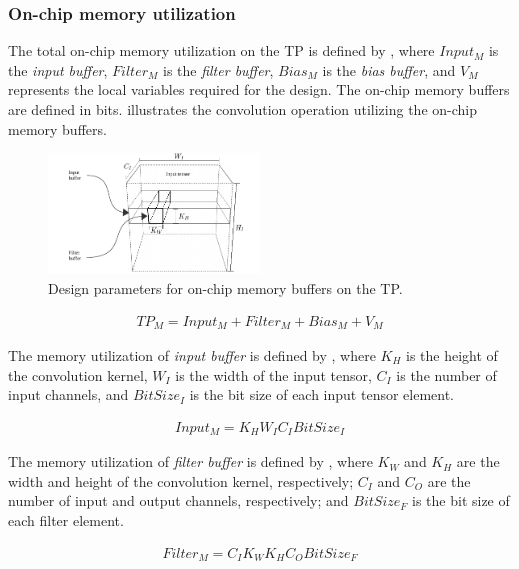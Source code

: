 \subsubsection{\textbf{On-chip memory utilization}}
The total on-chip memory utilization on the TP is defined by , where $Input_{M}$ is the \emph{input buffer}, $Filter_{M}$ is the \emph{filter buffer}, $Bias_{M}$ is the \emph{bias buffer}, and $V_{M}$ represents the local variables required for the design. The on-chip memory buffers are defined in bits.  illustrates the convolution operation utilizing the on-chip memory buffers.

\begin{figure}[t!]
	\centering
	\includegraphics[width=0.5\textwidth]{../figures/accelerator_buffers.pdf}
	\caption{Design parameters for on-chip memory buffers on the TP.}
	\label{fig:accelerator_buffers}
\end{figure}

\begin{eqnarray} \label{eq:tp_memory}
TP_{M}=Input_{M}+Filter_{M}+Bias_{M}+V_{M}
\end{eqnarray}

The memory utilization of \emph{input buffer} is defined by , where $K_{H}$ is the height of the convolution kernel, $W_{I}$ is the width of the input tensor, $C_{I}$ is the number of input channels, and $BitSize_{I}$ is the bit size of each input tensor element.

\begin{eqnarray} \label{eq:input_memory}
Input_{M}=K_{H}W_{I}C_{I}BitSize_{I}
\end{eqnarray}

The memory utilization of \emph{filter buffer} is defined by , where $K_{W}$ and $K_{H}$ are the width and height of the convolution kernel, respectively; $C_{I}$ and $C_{O}$ are the number of input and output channels, respectively; and $BitSize_{F}$ is the bit size of each filter element.

\begin{eqnarray} \label{eq:filter_memory}
Filter_{M}=C_{I}K_{W}K_{H}C_{O}BitSize_{F}
\end{eqnarray}

